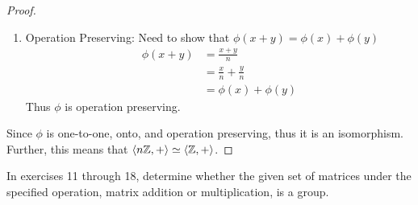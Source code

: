 \documentclass{article}
\begin{document}
\begin{enumerate}
{\begin{enumerate}
{\begin{proof}
\begin{enumerate}
                        \begin{align*}
                            y & = \phi(x) \\
                            y & = x/n \\
                            ny & = x
                        \end{align*}
                        Choose $x = ny$. Thus $\phi$ is onto.
                        \item Operation Preserving: Need to show that $\phi(x+y) = \phi(x) + \phi(y)$
                        \begin{align*}
                            \phi(x+y) & = \frac{x+y}{n} \\
                            & = \frac{x}{n} + \frac{y}{n} \\
                            & = \phi(x) + \phi(y)
                        \end{align*}
                        Thus $\phi$ is operation preserving.
                    \end{enumerate}
                    Since $\phi$ is one-to-one, onto, and operation preserving, thus it is an isomorphism. Further, this means that $\langle n\mathbb{Z}, + \rangle \simeq \langle \mathbb{Z},+ \rangle$.
                \end{proof}
            }
        \end{enumerate}
    }
\end{enumerate}
In exercises 11 through 18, determine whether the given set of matrices under the specified operation, matrix addition or multiplication, is a group.
\end{document}
